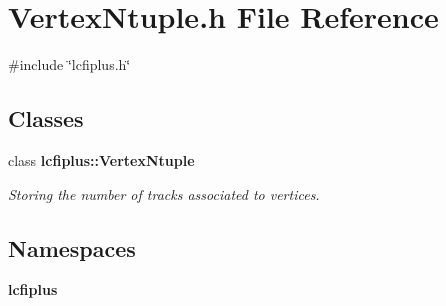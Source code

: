 \section{Vertex\+Ntuple.\+h File Reference}
\label{VertexNtuple_8h}
{\ttfamily \#include \char`\"{}lcfiplus.\+h\char`\"{}}\newline
\subsection*{Classes}
\begin{DoxyCompactItemize}
\item 
class \textbf{ lcfiplus\+::\+Vertex\+Ntuple}
\begin{DoxyCompactList}\small\item\em Storing the number of tracks associated to vertices. \end{DoxyCompactList}\end{DoxyCompactItemize}
\subsection*{Namespaces}
\begin{DoxyCompactItemize}
\item 
 \textbf{ lcfiplus}
\end{DoxyCompactItemize}
